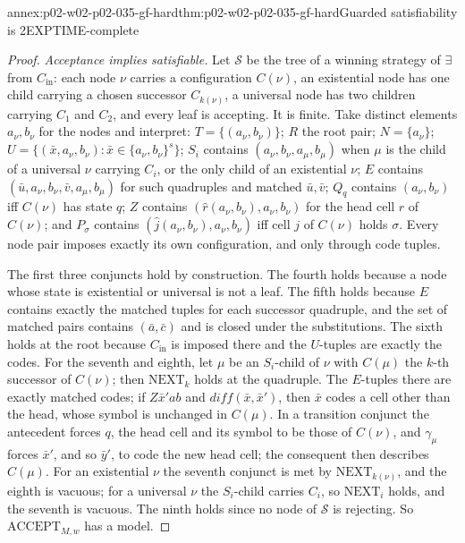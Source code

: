 \begin{annexitem}{annex:p02-w02-p02-035-gf-hard}{thm:p02-w02-p02-035-gf-hard}{Guarded satisfiability is 2EXPTIME-complete}
\begin{proof}
\emph{Acceptance implies satisfiable.}  Let \(\mathcal S\) be the tree of a
winning strategy of \(\exists\) from \(C_{\mathrm{in}}\): each node \(\nu\)
carries a configuration \(C(\nu)\), an existential node has one child
carrying a chosen successor \(C_{k(\nu)}\), a universal node has two
children carrying \(C_1\) and \(C_2\), and every leaf is accepting.  It is
finite.  Take distinct elements \(a_\nu,b_\nu\) for the nodes and interpret:
\(T=\{(a_\nu,b_\nu)\}\); \(R\) the root pair; \(N=\{a_\nu\}\);
\(U=\{(\bar x,a_\nu,b_\nu):\bar x\in\{a_\nu,b_\nu\}^{s}\}\);
\(S_i\) contains \((a_\nu,b_\nu,a_\mu,b_\mu)\) when \(\mu\) is the child of a
universal \(\nu\) carrying \(C_i\), or the only child of an existential
\(\nu\); \(E\) contains \((\bar u,a_\nu,b_\nu,\bar v,a_\mu,b_\mu)\) for such
quadruples and matched \(\bar u,\bar v\); \(Q_q\) contains
\((a_\nu,b_\nu)\) iff \(C(\nu)\) has state \(q\); \(Z\) contains
\((\hat r(a_\nu,b_\nu),a_\nu,b_\nu)\) for the head cell \(r\) of \(C(\nu)\);
and \(P_\sigma\) contains \((\hat j(a_\nu,b_\nu),a_\nu,b_\nu)\) iff cell \(j\)
of \(C(\nu)\) holds \(\sigma\).  Every node pair imposes exactly its own
configuration, and only through code tuples.

The first three conjuncts hold by construction.  The fourth holds because a
node whose state is existential or universal is not a leaf.  The fifth holds
because \(E\) contains exactly the matched tuples for each successor
quadruple, and the set of matched pairs contains \((\bar a,\bar c)\) and is
closed under the substitutions.  The sixth holds at the root because
\(C_{\mathrm{in}}\) is imposed there and the \(U\)-tuples are exactly the
codes.  For the seventh and eighth, let \(\mu\) be an \(S_i\)-child of
\(\nu\) with \(C(\mu)\) the \(k\)-th successor of \(C(\nu)\); then
\(\mathrm{NEXT}_k\) holds at the quadruple.  The \(E\)-tuples there are
exactly matched codes; if \(Z\bar x'ab\) and \(\mathit{diff}(\bar x,\bar x')\),
then \(\bar x\) codes a cell other than the head, whose symbol is unchanged
in \(C(\mu)\).  In a transition conjunct the antecedent forces \(q\), the
head cell and its symbol to be those of \(C(\nu)\), and \(\gamma_\mu\)
forces \(\bar x'\), and so \(\bar y'\), to code the new head cell; the
consequent then describes \(C(\mu)\).  For an existential \(\nu\) the
seventh conjunct is met by \(\mathrm{NEXT}_{k(\nu)}\), and the eighth is
vacuous; for a universal \(\nu\) the \(S_i\)-child carries \(C_i\), so
\(\mathrm{NEXT}_i\) holds, and the seventh is vacuous.  The ninth holds since
no node of \(\mathcal S\) is rejecting.  So
\(\mathrm{ACCEPT}_{M,w}\) has a model.


\end{proof}
\end{annexitem}
